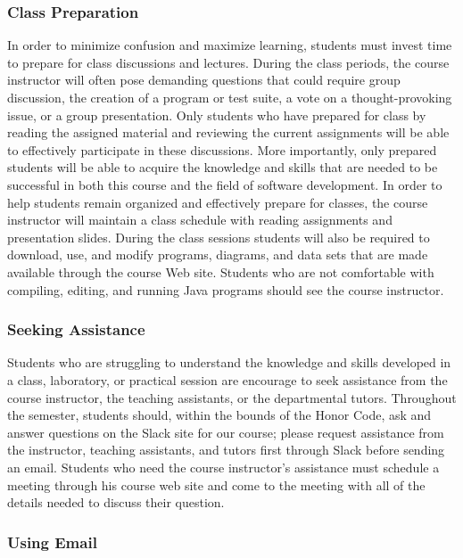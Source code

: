 \subsubsection*{Class Preparation}

In order to minimize confusion and maximize learning, students must invest time to prepare for class discussions and
lectures.  During the class periods, the course instructor will often pose demanding questions that could require group
discussion, the creation of a program or test suite, a vote on a thought-provoking issue, or a group presentation.
Only students who have prepared for class by reading the assigned material and reviewing the current assignments will be
able to effectively participate in these discussions.  More importantly, only prepared students will be able to acquire
the knowledge and skills that are needed to be successful in both this course and the field of software development.  In
order to help students remain organized and effectively prepare for classes, the course instructor will maintain a class
schedule with reading assignments and presentation slides.   During the class sessions students will also be required to
download, use, and modify programs, diagrams, and data sets that are made available through the course Web site.
Students who are not comfortable with compiling, editing, and running Java programs should see the course instructor.

\subsubsection*{Seeking Assistance}

Students who are struggling to understand the knowledge and skills developed in a class, laboratory, or practical
session are encourage to seek assistance from the course instructor, the teaching assistants, or the departmental
tutors. Throughout the semester, students should, within the bounds of the Honor Code, ask and answer questions on the
Slack site for our course; please request assistance from the instructor, teaching assistants, and tutors first through
Slack before sending an email. Students who need the course instructor's assistance must schedule a meeting through his
course web site and come to the meeting with all of the details needed to discuss their question.

\subsubsection*{Using Email}

